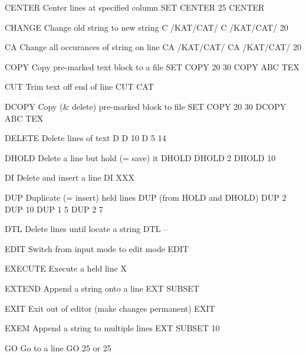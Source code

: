 CENTER    Center lines at specified column            SET CENTER 25
                                                      CENTER
 
CHANGE    Change old string to new string             C /KAT/CAT/
                                                      C /KAT/CAT/ 20
 
CA        Change all occurances of string on line     CA /KAT/CAT/
                                                      CA /KAT/CAT/ 20
 
COPY      Copy pre-marked text block to a file        SET COPY 20 30
                                                      COPY ABC TEX
 
CUT       Trim text off end of line                   CUT CAT
 
DCOPY     Copy (& delete) pre-marked block to file    SET COPY 20 30
                                                      DCOPY ABC TEX
 
DELETE    Delete lines of text                        D
                                                      D 10
                                                      D 5 14
 
DHOLD     Delete a line but hold (= save) it          DHOLD
                                                      DHOLD 2
                                                      DHOLD 10
 
DI        Delete and insert a line                    DI XXX
 
DUP       Duplicate (= insert) held lines             DUP
          (from HOLD and DHOLD)                       DUP 2
                                                      DUP 10
                                                      DUP 1 5
                                                      DUP 2 7
 
DTL       Delete lines until locate a string          DTL --
 
EDIT      Switch from input mode to edit mode         EDIT
 
EXECUTE   Execute a held line                         X
 
EXTEND    Append a string onto a line                 EXT  SUBSET
 
EXIT      Exit out of editor (make changes permanent) EXIT
 
EXEM      Append a string to multiple lines           EXT  SUBSET 10
 
GO        Go to a line                                GO 25
                                                      or 25
 
